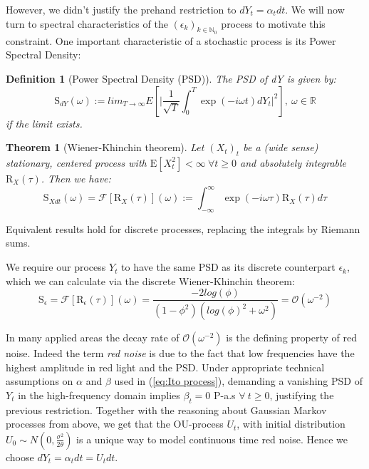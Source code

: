 \documentclass[%
thesis=student,%
coverpage=false,%
titlepage=false,%
headmarks=true, %
english,%
font=libertine, %
math=newpxtx, %
BCOR=5mm,%
coverBCOR=11mm%
]{tumbook}
\newtheorem{definition}{Definition}[section]
\newtheorem{theorem}{Theorem}
\begin{document}
However, we didn't justify the prehand restriction to $dY_{t} = \alpha_{t} dt$. We will now turn to spectral characteristics of the $(\epsilon_{k})_{k\in\mathbb{N}_{0}}$ process to motivate this constraint. One important characteristic of a stochastic process is its Power Spectral Density:


\begin{definition}[Power Spectral Density (PSD)]
The PSD of dY is given by:
\[
\mathrm{S}_{dY}(\omega) := lim_{T\rightarrow\infty}E[\lvert \frac{1}{\sqrt{T}}\int_{0}^{T}\exp(-i\omega t)dY_{t}\rvert^{2}], \ \omega \in \mathbb{R}
\]
if the limit exists.
\end{definition}

\begin{theorem}[Wiener-Khinchin theorem]
Let $(X_{t})_{t}$ be a (wide sense) stationary, centered process with $\mathrm{E}[X_{t}^2]<\infty \ \forall t \geq 0$ and absolutely integrable $\mathrm{R}_{X}(\tau)$. Then we have:
\[
\mathrm{S}_{Xdt}(\omega) = \mathcal{F}[\mathrm{R}_{X}(\tau)](\omega) := \int_{-\infty}^{\infty}\exp(-i\omega\tau)\mathrm{R}_{X}(\tau)d\tau
\]
\end{theorem}

Equivalent results hold for discrete processes, replacing the integrals by Riemann sums.

We require our process $Y_{t}$ to have the same PSD as its discrete counterpart $\epsilon_{k}$, which we can calculate via the discrete Wiener-Khinchin theorem:
\[
\mathrm{S}_{\epsilon} = \mathcal{F}[\mathrm{R}_{\epsilon}(\tau)](\omega) = \frac{-2log(\phi)}{(1-\phi^{2})(log(\phi)^{2}+\omega^{2})} = \mathcal{O}(\omega^{-2})
\]

In many applied areas the decay rate of $\mathcal{O}(\omega^{-2})$ is the defining property of red noise. Indeed the term \textit{red noise} is due to the fact that low frequencies have the highest amplitude in red light and the PSD. 
Under appropriate technical assumptions on $\alpha$ and $\beta$ used in (\ref{eq:Ito process}), demanding a vanishing PSD of $Y_{t}$ in the high-frequency domain implies $\beta_{t} = 0$ P-a.s $\forall \ t \geq 0$, justifying the previous restriction. Together with the reasoning about Gaussian Markov processes from above, we get that the OU-process $U_{t}$, with initial distribution $U_{0} \sim N(0,\frac{\sigma^2}{2\theta})$ is a unique way to model continuous time red noise. Hence we choose $dY_{t} = \alpha_{t}dt = U_{t}dt$. 
\end{document}
